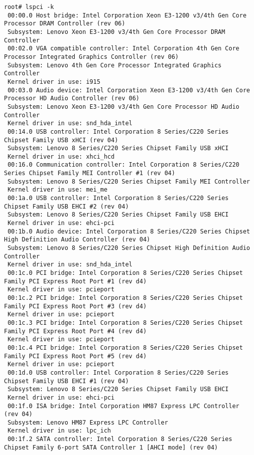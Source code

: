 \documentclass[11pt,a4paper]{article}
\begin{document}
                \begin{lstlisting}[style=BashInputRoot]
 root# lspci -k 
 00:00.0 Host bridge: Intel Corporation Xeon E3-1200 v3/4th Gen Core Processor DRAM Controller (rev 06)
 Subsystem: Lenovo Xeon E3-1200 v3/4th Gen Core Processor DRAM Controller
 00:02.0 VGA compatible controller: Intel Corporation 4th Gen Core Processor Integrated Graphics Controller (rev 06)
 Subsystem: Lenovo 4th Gen Core Processor Integrated Graphics Controller
 Kernel driver in use: i915
 00:03.0 Audio device: Intel Corporation Xeon E3-1200 v3/4th Gen Core Processor HD Audio Controller (rev 06)
 Subsystem: Lenovo Xeon E3-1200 v3/4th Gen Core Processor HD Audio Controller
 Kernel driver in use: snd_hda_intel
 00:14.0 USB controller: Intel Corporation 8 Series/C220 Series Chipset Family USB xHCI (rev 04)
 Subsystem: Lenovo 8 Series/C220 Series Chipset Family USB xHCI
 Kernel driver in use: xhci_hcd
 00:16.0 Communication controller: Intel Corporation 8 Series/C220 Series Chipset Family MEI Controller #1 (rev 04)
 Subsystem: Lenovo 8 Series/C220 Series Chipset Family MEI Controller
 Kernel driver in use: mei_me
 00:1a.0 USB controller: Intel Corporation 8 Series/C220 Series Chipset Family USB EHCI #2 (rev 04)
 Subsystem: Lenovo 8 Series/C220 Series Chipset Family USB EHCI
 Kernel driver in use: ehci-pci
 00:1b.0 Audio device: Intel Corporation 8 Series/C220 Series Chipset High Definition Audio Controller (rev 04)
 Subsystem: Lenovo 8 Series/C220 Series Chipset High Definition Audio Controller
 Kernel driver in use: snd_hda_intel
 00:1c.0 PCI bridge: Intel Corporation 8 Series/C220 Series Chipset Family PCI Express Root Port #1 (rev d4)
 Kernel driver in use: pcieport
 00:1c.2 PCI bridge: Intel Corporation 8 Series/C220 Series Chipset Family PCI Express Root Port #3 (rev d4)
 Kernel driver in use: pcieport
 00:1c.3 PCI bridge: Intel Corporation 8 Series/C220 Series Chipset Family PCI Express Root Port #4 (rev d4)
 Kernel driver in use: pcieport
 00:1c.4 PCI bridge: Intel Corporation 8 Series/C220 Series Chipset Family PCI Express Root Port #5 (rev d4)
 Kernel driver in use: pcieport
 00:1d.0 USB controller: Intel Corporation 8 Series/C220 Series Chipset Family USB EHCI #1 (rev 04)
 Subsystem: Lenovo 8 Series/C220 Series Chipset Family USB EHCI
 Kernel driver in use: ehci-pci
 00:1f.0 ISA bridge: Intel Corporation HM87 Express LPC Controller (rev 04)
 Subsystem: Lenovo HM87 Express LPC Controller
 Kernel driver in use: lpc_ich
 00:1f.2 SATA controller: Intel Corporation 8 Series/C220 Series Chipset Family 6-port SATA Controller 1 [AHCI mode] (rev 04)

\end{lstlisting}
\end{document}
